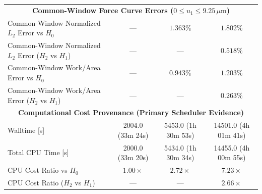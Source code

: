 \begin{table}[htbp]
\begin{tabular}{lccc}
\hline
\multicolumn{4}{c}{\textbf{Common-Window Force Curve Errors ($0 \le u_1 \le 9.25\,\mu\text{m}$)}} \\
Common-Window Normalized $L_2$ Error vs $H_0$ & --- & $1.363\%$ & $1.802\%$ \\
Common-Window Normalized $L_2$ Error ($H_2$ vs $H_1$) & --- & --- & $\mathbf{0.518\%}$ \\
Common-Window Work/Area Error vs $H_0$ & --- & $0.943\%$ & $1.203\%$ \\
Common-Window Work/Area Error ($H_2$ vs $H_1$) & --- & --- & $\mathbf{0.263\%}$ \\
\hline
\multicolumn{4}{c}{\textbf{Computational Cost Provenance (Primary Scheduler Evidence)}} \\
Walltime [s] & 2004.0 (33m 24s) & 5453.0 (1h 30m 53s) & 14501.0 (4h 01m 41s) \\
Total CPU Time [s] & 2000.0 (33m 20s) & 5434.0 (1h 30m 34s) & 14455.0 (4h 00m 55s) \\
CPU Cost Ratio vs $H_0$ & $1.00\times$ & $2.72\times$ & $7.23\times$ \\
CPU Cost Ratio ($H_2$ vs $H_1$) & --- & --- & $2.66\times$ \\
\hline
\end{tabular}
\end{table}

